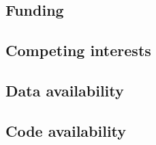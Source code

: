 \documentclass[pdflatex,sn-mathphys-num]{sn-jnl}
\theoremstyle{thmstyleone}%
\theoremstyle{thmstyletwo}%
\theoremstyle{thmstylethree}%
\begin{document}
\subsection*{Funding}

\subsection*{Competing interests}

\subsection*{Data availability}

\subsection*{Code availability}


\end{document}
